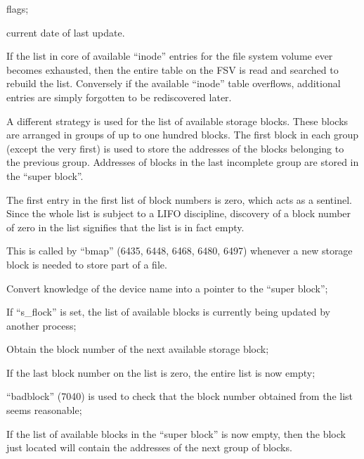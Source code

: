 \item flags;

\item current date of last update.
\ei


If the list in core of available
``inode'' entries for the file system
volume ever becomes exhausted, then the
entire table on the FSV is read and
searched to rebuild the list. Conversely if the available ``inode'' table
overflows, additional entries are simply forgotten to be rediscovered later.


A different strategy is used for the
list of available storage blocks.
These blocks are arranged in groups of
up to one hundred blocks. The first
block in each group (except the very
first) is used to store the addresses
of the blocks belonging to the previous
group. Addresses of blocks in the last
incomplete group are stored in the
``super block''.

The first entry in the first list of
block numbers is zero, which acts as a
sentinel. Since the whole list is subject to a LIFO discipline, discovery of
a block number of zero in the list signifies that the list is in fact empty.



This is called by ``bmap'' (6435, 6448,
6468, 6480, 6497) whenever a new
storage block is needed to store part
of a file.

\bd
\item[6961:] Convert knowledge of the device
      name into a pointer to the ``super
      block'';

\item[6962:] If ``s\_flock'' is set, the list of
      available blocks is currently
      being updated by another process;

\item[6967:] Obtain the block  number  of  the
      next available storage block;

\item[6968:] If the last block number  on  the
      list  is zero, the entire list is
      now empty;

\item[6970:] ``badblock''  (7040)  is  used   to
      check   that   the  block  number
      obtained from the list seems reasonable;

\item[6971:] If the list of  available  blocks
      in   the  ``super  block''  is  now
      empty,  then   the   block   just
      located    will    contain    the
      addresses of the  next  group  of blocks.

